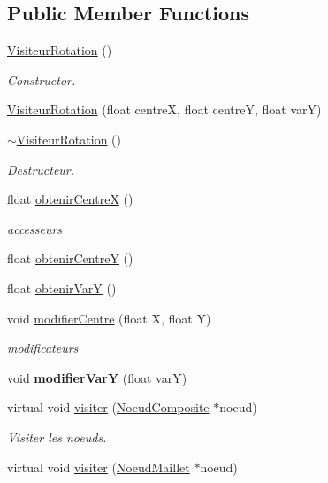 \subsection*{Public Member Functions}
\begin{DoxyCompactItemize}
\item 
\hyperlink{group__inf2990_ga3914046b79fcaa48a135c3026ad12f79}{Visiteur\+Rotation} ()
\begin{DoxyCompactList}\small\item\em Constructor. \end{DoxyCompactList}\item 
\hyperlink{group__inf2990_ga18c6ce771b0372f1ae0972bdfbb961db}{Visiteur\+Rotation} (float centreX, float centreY, float varY)
\item 
\hyperlink{group__inf2990_ga6a17793fa0206b9edaa7c1e7c9bd092c}{$\sim$\+Visiteur\+Rotation} ()
\begin{DoxyCompactList}\small\item\em Destructeur. \end{DoxyCompactList}\item 
float \hyperlink{group__inf2990_gab2365dc2295d046daf14cb3a52a61b41}{obtenir\+CentreX} ()
\begin{DoxyCompactList}\small\item\em accesseurs \end{DoxyCompactList}\item 
float \hyperlink{group__inf2990_ga04725f30de6cb19bc3a454ca5277afb9}{obtenir\+CentreY} ()
\item 
float \hyperlink{group__inf2990_ga8a151654f1636823250dc281de697ceb}{obtenir\+VarY} ()
\item 
void \hyperlink{group__inf2990_gad972a3de4ea8cffa5e81f99be35702dd}{modifier\+Centre} (float X, float Y)
\begin{DoxyCompactList}\small\item\em modificateurs \end{DoxyCompactList}\item 
void {\bfseries modifier\+VarY} (float varY)
\item 
virtual void \hyperlink{group__inf2990_ga8b2f030257b78e64844d3d6526fad507}{visiter} (\hyperlink{class_noeud_composite}{Noeud\+Composite} $\ast$noeud)
\begin{DoxyCompactList}\small\item\em Visiter les noeuds. \end{DoxyCompactList}\item 
virtual void \hyperlink{group__inf2990_gaae32e22552eb3261ac6d5eaf8812acd8}{visiter} (\hyperlink{class_noeud_maillet}{Noeud\+Maillet} $\ast$noeud)

\end{DoxyCompactItemize}
